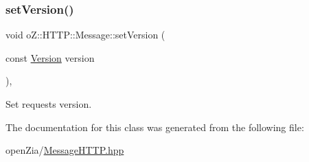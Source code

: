 \subsubsection{\texorpdfstring{setVersion()}{setVersion()}}
{\footnotesize\ttfamily void o\+Z\+::\+H\+T\+T\+P\+::\+Message\+::set\+Version (\begin{DoxyParamCaption}\item[{const \mbox{\hyperlink{structo_z_1_1_h_t_t_p_1_1_version}{Version}}}]{version }\end{DoxyParamCaption})\hspace{0.3cm}{\ttfamily [inline]}, {\ttfamily [noexcept]}}



Set request\textquotesingle{}s version. 



The documentation for this class was generated from the following file\+:\begin{DoxyCompactItemize}
\item 
open\+Zia/\mbox{\hyperlink{_message_h_t_t_p_8hpp}{Message\+H\+T\+T\+P.\+hpp}}\end{DoxyCompactItemize}
